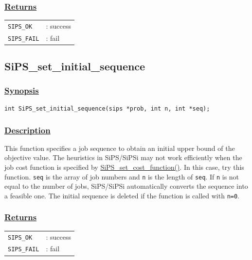 \documentclass[a4paper]{book}
\begin{document}
\subsubsection{\underline{Returns}}

\begin{tabular}{ll}
  \verb+SIPS_OK+  &: success\\
  \verb+SIPS_FAIL+&: fail\\
\end{tabular}

\hypertarget{SiPS_set_initial_sequence}{%
\subsection{SiPS\_set\_initial\_sequence}
}

\subsubsection{\underline{Synopsis}}

\begin{verbatim}
int SiPS_set_initial_sequence(sips *prob, int n, int *seq);
\end{verbatim}

\subsubsection{\underline{Description}}

This function specifies a job sequence to obtain an initial upper bound of the objective value.
The heuristics in SiPS/SiPSi may not work efficiently when the job cost function is specified by \hyperlink{SiPS_set_cost_function}{SiPS\_set\_cost\_function()}.
In this case, try this function.
\verb+seq+ is the array of job numbers and \verb+n+ is the length of \verb+seq+.
If \verb+n+ is not equal to the number of jobs, SiPS/SiPSi automatically converts the sequence into a feasible one.
The initial sequence is deleted if the function is called with \verb+n=0+.

\subsubsection{\underline{Returns}}

\begin{tabular}{ll}
  \verb+SIPS_OK+  &: success\\
  \verb+SIPS_FAIL+&: fail\\
\end{tabular}
\end{document}
